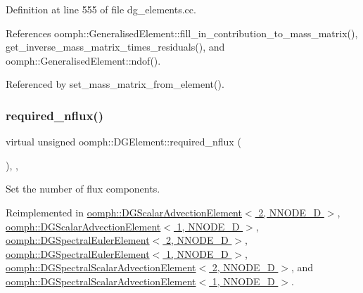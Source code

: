 Definition at line 555 of file dg\+\_\+elements.\+cc.



References oomph\+::\+Generalised\+Element\+::fill\+\_\+in\+\_\+contribution\+\_\+to\+\_\+mass\+\_\+matrix(), get\+\_\+inverse\+\_\+mass\+\_\+matrix\+\_\+times\+\_\+residuals(), and oomph\+::\+Generalised\+Element\+::ndof().



Referenced by set\+\_\+mass\+\_\+matrix\+\_\+from\+\_\+element().

\mbox{\label{classoomph_1_1DGElement_a87dc9f5b40437c3ab22db35229012c07}} 
\subsubsection{\texorpdfstring{required\+\_\+nflux()}{required\_nflux()}}
{\footnotesize\ttfamily virtual unsigned oomph\+::\+D\+G\+Element\+::required\+\_\+nflux (\begin{DoxyParamCaption}{ }\end{DoxyParamCaption})\hspace{0.3cm}{\ttfamily [inline]}, {\ttfamily [protected]}, {\ttfamily [virtual]}}



Set the number of flux components. 



Reimplemented in \hyperlink{classoomph_1_1DGScalarAdvectionElement_3_012_00_01NNODE__1D_01_4_a316a94ee11fe6fe52e25a2eec1b4a1c8}{oomph\+::\+D\+G\+Scalar\+Advection\+Element$<$ 2, N\+N\+O\+D\+E\+\_\+D $>$}, \hyperlink{classoomph_1_1DGScalarAdvectionElement_3_011_00_01NNODE__1D_01_4_ae2edc6f1cca20b5308f50e1ae24bd6cd}{oomph\+::\+D\+G\+Scalar\+Advection\+Element$<$ 1, N\+N\+O\+D\+E\+\_\+D $>$}, \hyperlink{classoomph_1_1DGSpectralEulerElement_3_012_00_01NNODE__1D_01_4_a070767446172be36e3abd6faa624d71d}{oomph\+::\+D\+G\+Spectral\+Euler\+Element$<$ 2, N\+N\+O\+D\+E\+\_\+D $>$}, \hyperlink{classoomph_1_1DGSpectralEulerElement_3_011_00_01NNODE__1D_01_4_a8a7b3f093854cccf1cc12f1f9d381a54}{oomph\+::\+D\+G\+Spectral\+Euler\+Element$<$ 1, N\+N\+O\+D\+E\+\_\+D $>$}, \hyperlink{classoomph_1_1DGSpectralScalarAdvectionElement_3_012_00_01NNODE__1D_01_4_a7a4facebbe8b314a1364472e66646e55}{oomph\+::\+D\+G\+Spectral\+Scalar\+Advection\+Element$<$ 2, N\+N\+O\+D\+E\+\_\+D $>$}, and \hyperlink{classoomph_1_1DGSpectralScalarAdvectionElement_3_011_00_01NNODE__1D_01_4_a0966bfa51ec4e244580be3212c1db919}{oomph\+::\+D\+G\+Spectral\+Scalar\+Advection\+Element$<$ 1, N\+N\+O\+D\+E\+\_\+D $>$}.



